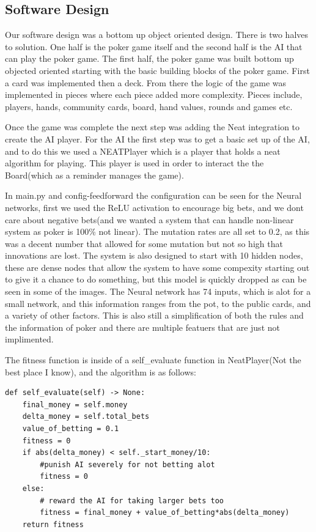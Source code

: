 \subsection{Software Design}
Our software design was a bottom up object oriented design. There is two halves to solution. One half is the poker game itself and the second half is the AI that can play the poker game. The first half, the poker game was built bottom up objected oriented starting with the basic building blocks of the poker game. First a card was implemented then a deck. From there the logic of the game was implemented in pieces where each piece added more complexity. Pieces include, players, hands, community cards, board, hand values, rounds and games etc. 

Once the game was complete the next step was adding the Neat integration to create the AI player. For the AI
the first step was to get a basic set up of the AI, and to do this we used a NEATPlayer which is a player that
holds a neat algorithm for playing. This player is used in order to interact the the Board(which as a reminder
manages the game).

In main.py and config-feedforward the configuration can be seen for the Neural networks, first we used the ReLU
activation to encourage big bets, and we dont care about negative bets(and we wanted a system that can handle
non-linear system as poker is 100\% not linear). The mutation rates are all set to 0.2, as this was a decent
number that allowed for some mutation but not so high that innovations are lost.
The system is also designed to start with 10 hidden nodes, these are dense nodes that allow the system to have
some compexity starting out to give it a chance to do something, but this model is quickly dropped as can be
seen in some of the images. The Neural network has 74 inputs, which is alot for a small network, and this
information ranges from the pot, to the public cards, and a variety of other factors. This is also still a
simplification of both the rules and the information of poker and there are multiple featuers that are just not implimented.

The fitness function is inside of a self\_evaluate function in NeatPlayer(Not the best place I know), and the
algorithm is as follows: 
\begin{verbatim}
def self_evaluate(self) -> None:
    final_money = self.money
    delta_money = self.total_bets
    value_of_betting = 0.1
    fitness = 0
    if abs(delta_money) < self._start_money/10:
        #punish AI severely for not betting alot
        fitness = 0
    else:
        # reward the AI for taking larger bets too
        fitness = final_money + value_of_betting*abs(delta_money)
    return fitness
\end{verbatim}

